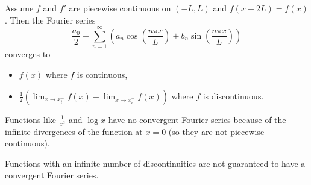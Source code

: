 \begin{theorem}\label{thrm:fourierconv}
	Assume $f$ and $f'$ are piecewise continuous on $(-L,L)$ and $f(x+2L)=f(x)$. Then the Fourier series
	\[
	\frac{a_0}{2} + \sum_{n=1}^{\infty} \left(a_n \cos{\left(\frac{n\pi x}{L}\right)} + b_n \sin{\left(\frac{n\pi x}{L}\right)}\right)
	\]
	converges to
	\begin{itemize}
		\item $f(x)$ where $f$ is continuous,
		\item $\frac12 \left(\lim_{x\to x_i^-} f(x) + \lim_{x\to x_i^+} f(x)\right)$ where $f$ is discontinuous.
	\end{itemize}
\end{theorem}

\begin{remark}
	Functions like $\frac{1}{x^2}$ and $\log{x}$ have no convergent Fourier series because of the infinite divergences of the function at $x=0$ (so they are not piecewise continuous).
\end{remark}

\begin{remark}
	Functions with an infinite number of discontinuities are not guaranteed to have a convergent Fourier series.
\end{remark}


